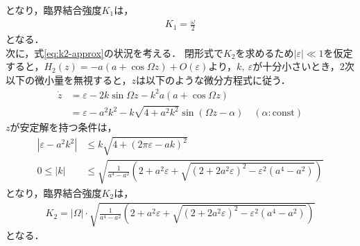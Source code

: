 \documentclass[../main]{subfiles}
\begin{document}
    となり，臨界結合強度$K_1$は，
    \begin{align*}
        K_1=\frac{\omega}{2}
    \end{align*}
    となる．\\
    次に，式\eqref{eq:k2-approx}の状況を考える．
    閉形式で$K_2$を求めるため$|\varepsilon| \ll 1$を仮定すると，$H_2(z)=-a(a+\cos\Omega z)+O(\varepsilon)$より，$k,\ \varepsilon$が十分小さいとき，$2$次以下の微小量を無視すると，$z$は以下のような微分方程式に従う．
    \begin{align*}
        \dot{z}&=\varepsilon-2k\sin\Omega z-k^2a(a+\cos \Omega z)\\
        &=\varepsilon-a^2k^2-k\sqrt{4+a^2k^2}\sin (\Omega z-\alpha)\quad(\alpha:\mathrm{const})
    \end{align*}
    $z$が安定解を持つ条件は，
    \begin{align*}
        |\varepsilon-a^2k^2|&\leq k\sqrt{4+(2\pi\varepsilon-ak)^2}\\
        0\leq |k|&\leq \sqrt{\frac{1}{a^4-a^2}\left(2+a^2\varepsilon+\sqrt{(2+2a^2\varepsilon)^2-\varepsilon^2(a^4-a^2)}\right)}
    \end{align*}
    となり，臨界結合強度$K_2$は，
    \begin{align*}
        K_2=|\Omega|\cdot\sqrt{\frac{1}{a^4-a^2}\left(2+a^2\varepsilon+\sqrt{(2+2a^2\varepsilon)^2-\varepsilon^2(a^4-a^2)}\right)}
    \end{align*}
    となる．    
    
\end{document}
